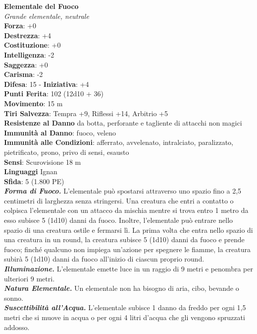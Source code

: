 \begin{multicols}{2}
\medskip\textbf{Elementale del Fuoco}\\
\emph{Grande elementale, neutrale}\\
\textbf{Forza}: +0\\
\textbf{Destrezza}: +4\\
\textbf{Costituzione}: +0\\
\textbf{Intelligenza}: -2\\
\textbf{Saggezza}: +0\\
\textbf{Carisma}: -2\\
\textbf{Difesa}: 15 - \textbf{Iniziativa}: +4\\
\textbf{Punti Ferita}: 102 (12d10 + 36)\\
\textbf{Movimento}: 15 m\\
\textbf{Tiri Salvezza}: Tempra +9, Riflessi +14, Arbitrio +5\\
\textbf{Resistenze al Danno} da botta, perforante e tagliente di attacchi non magici\\
\textbf{Immunità al Danno}: fuoco, veleno\\
\textbf{Immunità alle Condizioni}: afferrato, avvelenato, intralciato, paralizzato, pietrificato, prono, privo di sensi, esausto \\
\textbf{Sensi}: Scurovisione 18 m\\
\textbf{Linguaggi} Ignan\\
\textbf{Sfida}: 5 (1.800 PE)\smallskip\\
\emph{\textbf{Forma di Fuoco.}} L'elementale può spostarsi attraverso uno spazio fino a 2,5 centimetri di larghezza senza stringersi. Una creatura che entri a contatto o colpisca l'elementale con un attacco da mischia mentre si trova entro 1 metro da esso subisce 5 (1d10) danni da fuoco. Inoltre, l'elementale può entrare nello spazio di una creatura ostile e fermarsi lì. La prima volta che entra nello spazio di una creatura in un round, la creatura subisce 5 (1d10) danni da fuoco e prende fuoco; finché qualcuno non impiega un'azione per spegnere le fiamme, la creatura subirà 5 (1d10) danni da fuoco all'inizio di ciascun proprio round.\\
\emph{\textbf{Illuminazione.}} L'elementale emette luce in un raggio di 9 metri e penombra per ulteriori 9 metri.\\
\emph{\textbf{Natura Elementale.}} Un elementale non ha bisogno di aria, cibo, bevande o sonno.\\
\emph{\textbf{Suscettibilità all'Acqua.}} L'elementale subisce 1 danno da freddo per ogni 1,5 metri che si muove in acqua o per ogni 4 litri d'acqua che gli vengono spruzzati addosso.\\

\end{multicols}
